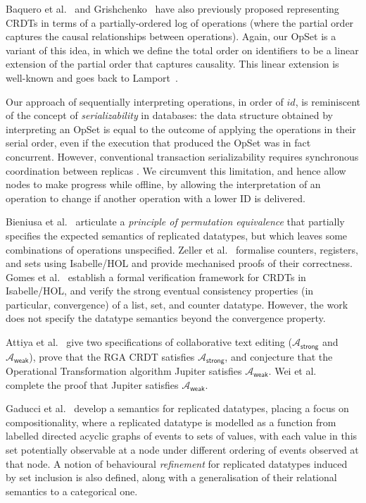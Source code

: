 Baquero et al.~\cite{Baquero:2014ed} and Grishchenko~\cite{Grishchenko:2014eh} have also previously proposed representing CRDTs in terms of a partially-ordered log of operations (where the partial order captures the causal relationships between operations).
Again, our OpSet is a variant of this idea, in which we define the total order on identifiers to be a linear extension of the partial order that captures causality.
This linear extension is well-known and goes back to Lamport~\cite{Lamport:1978jq}.

Our approach of sequentially interpreting operations, in order of $\mathit{id}$, is reminiscent of the concept of \emph{serializability} in databases: the data structure obtained by interpreting an OpSet is equal to the outcome of applying the operations in their serial order, even if the execution that produced the OpSet was in fact concurrent.
However, conventional transaction serializability requires synchronous coordination between replicas \cite{Davidson:1985hv}.
We circumvent this limitation, and hence allow nodes to make progress while offline, by allowing the interpretation of an operation to change if another operation with a lower ID is delivered.

Bieniusa et al.~\cite{Bieniusa:2012gt} articulate a \emph{principle of permutation equivalence} that partially specifies the expected semantics of replicated datatypes, but which leaves some combinations of operations unspecified.
Zeller et al.~\cite{Zeller:2014fl} formalise counters, registers, and sets using Isabelle/HOL and provide mechanised proofs of their correctness.
Gomes et al.~\cite{Gomes:2017gy} establish a formal verification framework for CRDTs in Isabelle/HOL, and verify the strong eventual consistency properties (in particular, convergence) of a list, set, and counter datatype.
However, the work does not specify the datatype semantics beyond the convergence property.

Attiya et al.~\cite{Attiya:2016kh} give two specifications of collaborative text editing ($\mathcal{A}_\textsf{strong}$ and $\mathcal{A}_\textsf{weak}$), prove that the RGA CRDT \cite{Roh:2011dw} satisfies $\mathcal{A}_\textsf{strong}$, and conjecture that the Operational Transformation algorithm Jupiter \cite{Nichols:1995fd} satisfies $\mathcal{A}_\textsf{weak}$.
Wei et al.~\cite{Wei:2017tg} complete the proof that Jupiter satisfies $\mathcal{A}_\textsf{weak}$.

Gaducci et al.~\cite{DBLP:conf/coordination/GadducciMR17} develop a semantics for replicated datatypes, placing a focus on compositionality, where a replicated datatype is modelled as a function from labelled directed acyclic graphs of events to sets of values, with each value in this set potentially observable at a node under different ordering of events observed at that node.
A notion of behavioural \emph{refinement} for replicated datatypes induced by set inclusion is also defined, along with a generalisation of their relational semantics to a categorical one.

